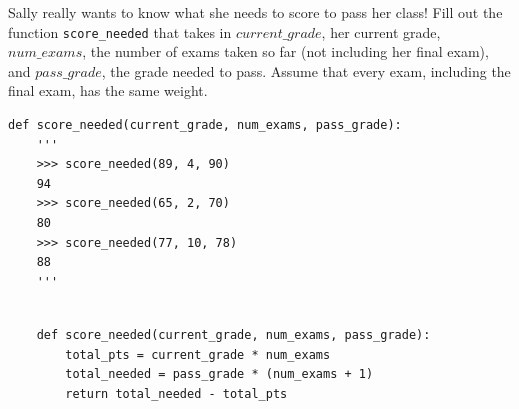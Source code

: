 \question Sally really wants to know what she needs to score to pass her class! Fill out the function \lstinline{score_needed} that takes in $current\_grade$, her current grade, $num\_exams$, the number of exams taken so far (not including her final exam), and $pass\_grade$, the grade needed to pass. Assume that every exam, including the final exam, has the same weight. 

\begin{blocksection}
\begin{lstlisting}
def score_needed(current_grade, num_exams, pass_grade):
    '''
    >>> score_needed(89, 4, 90)
    94
    >>> score_needed(65, 2, 70)
    80
    >>> score_needed(77, 10, 78)
    88
    '''
    

\end{lstlisting}
\end{blocksection}

\begin{blocksection}
\begin{solution}[0in]
\begin{lstlisting}
    def score_needed(current_grade, num_exams, pass_grade):
        total_pts = current_grade * num_exams
        total_needed = pass_grade * (num_exams + 1)
        return total_needed - total_pts
\end{lstlisting}
\end{solution}
\end{blocksection}